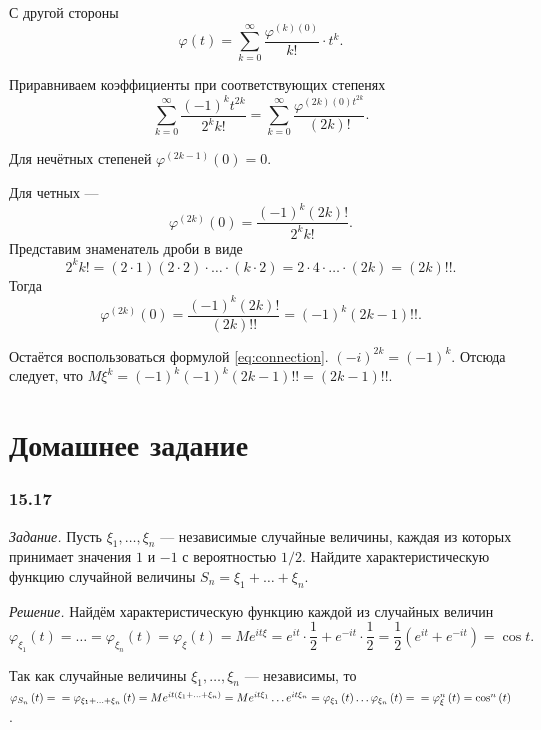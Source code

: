 С другой стороны
$$ \varphi \left( t \right) =
\sum \limits_{k = 0}^{ \infty } \frac{ \varphi^{ \left( k \right) \left( 0 \right) }}{k!} \cdot t^k.$$

Приравниваем коэффициенты при соответствующих степенях
$$ \sum \limits_{k = 0}^{ \infty } \frac{ \left( -1 \right)^k t^{2k}}{2^k k!} =
\sum \limits_{k = 0}^{ \infty } \frac{ \varphi^{ \left( 2k \right) \left( 0 \right) t^{2k}}}{ \left( 2k \right)!}.$$

Для нечётных степеней $ \varphi^{ \left( 2k - 1 \right) } \left( 0 \right) = 0$.

Для четных ---
$$ \varphi^{ \left( 2k \right) } \left( 0 \right) =
\frac{ \left( -1 \right)^k \left( 2k \right)!}{2^k k!}.$$
Представим знаменатель дроби в виде
$$2^k k! =
\left( 2 \cdot 1 \right) \left( 2 \cdot 2 \right) \cdot \dotsc \cdot \left( k \cdot 2 \right) =
2 \cdot 4 \cdot \dotsc \cdot \left( 2k \right) =
\left( 2k \right)!!.$$
Тогда
$$ \varphi^{ \left( 2k \right) } \left( 0 \right) =
\frac{ \left( -1 \right)^k \left( 2k \right)!}{ \left( 2k \right)!!} =
\left( -1 \right)^k \left( 2k - 1 \right)!!.$$

Остаётся воспользоваться формулой \eqref{eq:connection}.
$ \left( -i \right)^{2k} =
\left( -1 \right)^k$.
Отсюда следует, что $M \xi^k = \left( -1 \right)^k \left( -1 \right)^k \left( 2k - 1 \right)!! = \left( 2k - 1 \right)!!$.

\section*{Домашнее задание}

\subsubsection*{15.17}

\textit{Задание.} Пусть $ \xi_1, \dotsc, \xi_n$ --- независимые случайные величины, каждая из которых принимает значения $1$ и $- 1$ с вероятностью $1 / 2$.
Найдите характеристическую функцию случайной величины $S_n = \xi_1 + \dotsc + \xi_n$.

\textit{Решение.} Найдём характеристическую функцию каждой из случайных величин
$$ \varphi_{ \xi_1} \left( t \right) =
\dotsc =
\varphi_{ \xi_n} \left( t \right) =
\varphi_{ \xi } \left( t \right) =
Me^{it \xi } =
e^{it} \cdot \frac{1}{2} + e^{- it} \cdot \frac{1}{2} =
\frac{1}{2} \left( e^{it} + e^{- it} \right) =
\cos t.$$

Так как случайные величины $ \xi_1, \dotsc, \xi_n$ --- независимы,
то
$ \varphi_{S_n} \left( t \right) = \\
= \varphi_{ \xi_1 + \dotsc + \xi_n} \left( t \right) =
Me^{it \left( \xi_1 + \dotsc + \xi_n \right) } =
Me^{it \xi_1} \dotsc e^{it \xi_n} =
\varphi_{ \xi_1} \left( t \right) \dotsc \varphi_{ \xi_n} \left( t \right) = \\
= \varphi_{ \xi}^n \left( t \right) =
\cos^n \left( t \right) $.

